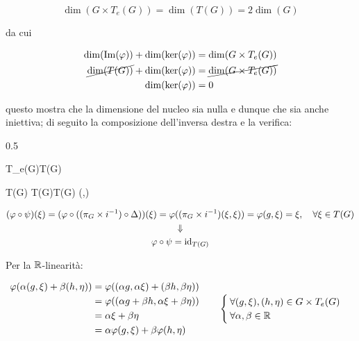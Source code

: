{\begin{equation}
	\dim(G \times T_{e}(G)) = \dim(T(G)) = 2 \dim(G)
\end{equation}

da cui

\begin{align}
	\begin{split}
		\dim(\Im(\varphi)) + \dim(\ker(\varphi)) &= \dim(G \times T_{e}(G)) \\
		\cancel{ \dim(T(G)) } + \dim(\ker(\varphi)) &= \cancel{ \dim(G \times T_{e}(G)) } \\
		\dim(\ker(\varphi)) &= 0
	\end{split}
\end{align}

questo mostra che la dimensione del nucleo sia nulla e dunque che sia anche iniettiva; di seguito la composizione dell'inversa destra e la verifica:

	{0.5}{%
				{T_{e}(G)}{T(G)}
				{\xi}{\xi}
			
			\map{\Delta}
				{T(G) \times T(G)}{T(G)}
				{\xi}{(\xi,\xi)}
			}

\begin{gather}
	(\varphi \circ \psi)(\xi) = (\varphi \circ ((\pi_{G} \times i^{-1}) \circ \Delta))(\xi) %
	= \varphi ((\pi_{G} \times i^{-1})(\xi,\xi)) %
	= \varphi(g,\xi) %
	= \xi %
	\qcomma \forall \xi \in T(G) \nonumber \\
	\Downarrow \\
	\varphi \circ \psi = \id_{T(G)} \nonumber
\end{gather}

Per la $ \mathbb{R} $-linearità:

\begin{align}
	\begin{split}
		\varphi(\alpha (g,\xi) + \beta (h,\eta)) &= \varphi((\alpha g,\alpha \xi) + (\beta h,\beta \eta)) \\
		&= \varphi((\alpha g + \beta h,\alpha \xi + \beta \eta)) \\
		&= \alpha \xi + \beta \eta \\
		&= \alpha \varphi(g,\xi) + \beta \varphi(h,\eta)
	\end{split} %
	\qquad %
	\begin{cases}
		\forall (g,\xi),(h,\eta) \in G \times T_{e}(G) \\
		\forall \alpha,\beta \in \R
	\end{cases}
\end{align}

}

